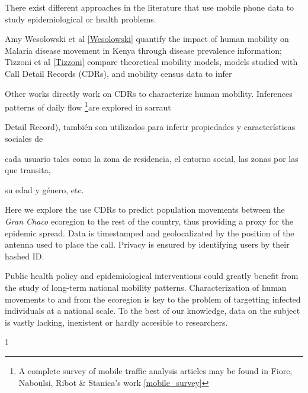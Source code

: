 There exist different approaches in the literature that use mobile phone data to study epidemiological or health problems. \begin{comment} La siguiente info la saco de aqui  https://docs.google.com/document/d/1ZClgYFTLCxmg7wvRXqz2V1EP7Wcg0vd2ZwEBOLW2VOk \end{comment} Amy Wesolowski et al \ref{Wesolowski} quantify the impact of human mobility on Malaria disease movement in Kenya through disease prevalence information; Tizzoni et al \ref{Tizzoni} compare theoretical mobility models, models studied with Call Detail Records (CDRs), and mobility census data to infer 

Other works directly work on CDRs to characterize human mobility. Inferences patterns of daily flow 
\footnote{A complete survey of mobile traffic analysis articles may be found in Fiore, Naboulsi, Ribot & Stanica's work \ref{mobile_survey} }are explored in sarraut



Detail Record), también son utilizados para inferir propiedades y características sociales de

cada usuario tales como la zona de residencia, el entorno social, las zonas por las que transita,

su edad y género, etc.


Here we explore the use CDRs to predict population movements between the \textit{Gran Chaco} ecoregion to the rest of the country, thus providing a proxy for the epidemic spread. Data is timestamped and geolocalizated by the position of the antenna used to place the call. Privacy is ensured by identifying users by their hashed ID. \begin{comment}el tema de la privacidad es siempre tan importante que lo pongo aca... haria falta agregar que no tenemos acceso a las claves de encriptacion. \end{comment}

Public health policy and epidemiological interventions could greatly benefit from the study of long-term national mobility patterns. Characterization of human movements to and from the ecoregion is key to the problem of targetting infected individuals at a national scale. To the best of our knowledge, data on the subject is vastly lacking, inexistent or hardly accesible to researchers. 

1
